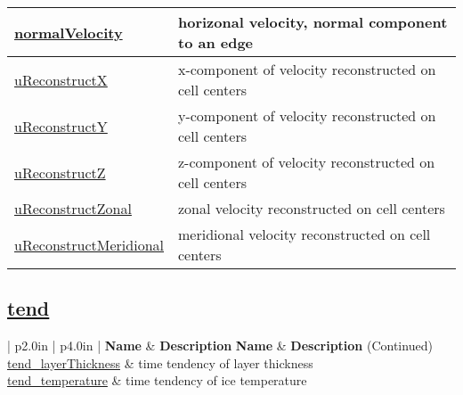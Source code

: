 {\begin{center}
\begin{longtable}{| p{2.0in} | p{4.0in} |}
	\hline
	\hyperref[subsec:var_sec_state_normalVelocity]{normalVelocity} & horizonal velocity, normal component to an edge \\
	\hline
	\hyperref[subsec:var_sec_state_uReconstructX]{uReconstructX} & x-component of velocity reconstructed on cell centers \\
	\hline
	\hyperref[subsec:var_sec_state_uReconstructY]{uReconstructY} & y-component of velocity reconstructed on cell centers \\
	\hline
	\hyperref[subsec:var_sec_state_uReconstructZ]{uReconstructZ} & z-component of velocity reconstructed on cell centers \\
	\hline
	\hyperref[subsec:var_sec_state_uReconstructZonal]{uReconstructZonal} & zonal velocity reconstructed on cell centers \\
	\hline
	\hyperref[subsec:var_sec_state_uReconstructMeridional]{uReconstructMeridional} & meridional velocity reconstructed on cell centers \\
	\hline
\end{longtable}
\end{center}
}
\subsection[tend]{\hyperref[sec:var_sec_tend]{tend}}
\label{subsec:forward_var_tab_tend}
\vspace{0.5in}
{\small
\begin{center}
\begin{longtable}{| p{2.0in} | p{4.0in} |}
	\hline
	{\bf Name} & {\bf Description} \endfirsthead
	\hline 
	{\bf Name} & {\bf Description} (Continued) \endhead
	\hline
	\hyperref[subsec:var_sec_tend_tend_layerThickness]{tend\_layerThickness} & time tendency of layer thickness \\
	\hline
	\hyperref[subsec:var_sec_tend_tend_temperature]{tend\_temperature} & time tendency of ice temperature \\
	\hline
\end{longtable}
\end{center}
}
